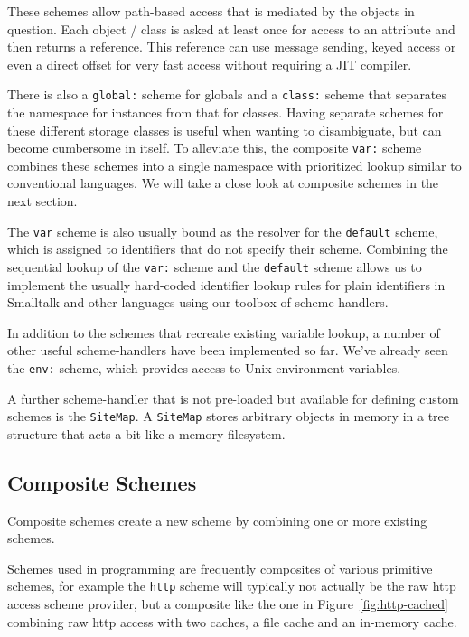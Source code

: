 \documentclass[preprint]{sigplanconf}
\begin{document}
These schemes allow path-based access
that is mediated by the objects in question.   Each object / class is asked at least
once for access to an attribute and then returns a reference.   This reference can
use message sending, keyed access or even a direct offset for very fast
access without requiring a JIT compiler.

There is also a {\tt global:} scheme for globals and a {\tt class:} scheme that separates
the namespace for instances from that for classes.  Having separate schemes for
these different storage classes is useful when wanting to disambiguate,
but can become cumbersome in itself.  To alleviate this, the composite
{\tt var:} scheme combines these schemes into a single namespace
with prioritized lookup similar to conventional languages.  We will take
a close look at composite schemes in the next section.  

The {\tt var} scheme is also usually bound as the resolver for the {\tt default}
scheme, which is assigned to identifiers that do not specify their scheme.
Combining the sequential lookup of the {\tt var:} scheme and the {\tt default}
scheme allows us to implement the usually hard-coded identifier lookup
rules for plain identifiers in Smalltalk and other languages using
our toolbox of scheme-handlers.

In addition to the schemes that recreate existing variable lookup, a number
of other useful scheme-handlers have been implemented so far.  We've
already seen the {\tt env:} scheme, which provides access to Unix
environment variables.  

A further scheme-handler that is not pre-loaded but available for defining
custom schemes is the {\tt SiteMap}.  A {\tt SiteMap} stores arbitrary objects
in memory in a tree structure that acts a bit like a memory filesystem.

\subsection{Composite Schemes}
\label{compositeSchemes}
Composite schemes  create a new scheme by combining one or 
more existing schemes. 

 Schemes used in programming 
are frequently composites of various primitive schemes, for example
the {\tt http} scheme will typically not actually be the raw http access
scheme provider, but a composite like the one in Figure~\ref{fig:http-cached} combining
raw http access with two caches, a file cache and an in-memory cache.
\end{document}
